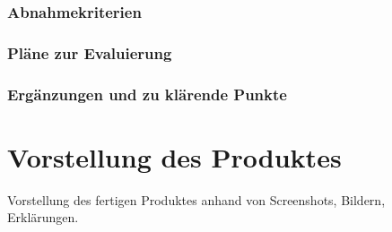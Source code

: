 \subsection{Abnahmekriterien}
\subsection{Pläne zur Evaluierung}
\subsection{Ergänzungen und zu klärende Punkte}

\chapter{Vorstellung des Produktes}
Vorstellung des fertigen Produktes anhand von Screenshots, Bildern, Erklärungen.

